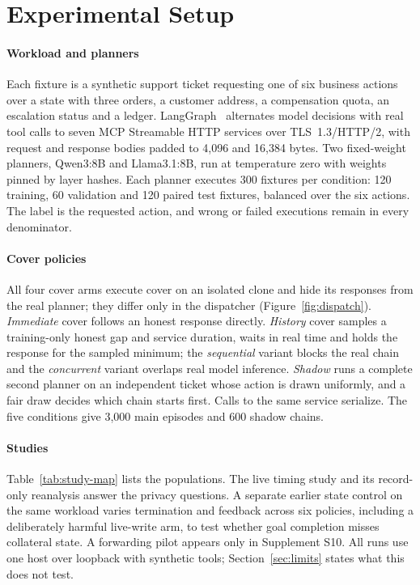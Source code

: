 \section{Experimental Setup}\label{sec:setup}
\paragraph{Workload and planners}
Each fixture is a synthetic support ticket requesting one of six business actions over a state with three orders, a customer address, a compensation quota, an escalation status and a ledger. LangGraph~\cite{langchain2025langgraph} alternates model decisions with real tool calls to seven MCP Streamable HTTP services over TLS~1.3/HTTP/2, with request and response bodies padded to 4,096 and 16,384 bytes. Two fixed-weight planners, Qwen3:8B and Llama3.1:8B, run at temperature zero with weights pinned by layer hashes. Each planner executes 300 fixtures per condition: 120 training, 60 validation and 120 paired test fixtures, balanced over the six actions. The label is the requested action, and wrong or failed executions remain in every denominator.

\paragraph{Cover policies}
All four cover arms execute cover on an isolated clone and hide its responses from the real planner; they differ only in the dispatcher (Figure~\ref{fig:dispatch}). \emph{Immediate} cover follows an honest response directly. \emph{History} cover samples a training-only honest gap and service duration, waits in real time and holds the response for the sampled minimum; the \emph{sequential} variant blocks the real chain and the \emph{concurrent} variant overlaps real model inference. \emph{Shadow} runs a complete second planner on an independent ticket whose action is drawn uniformly, and a fair draw decides which chain starts first. Calls to the same service serialize. The five conditions give 3,000 main episodes and 600 shadow chains.




\paragraph{Studies}
Table~\ref{tab:study-map} lists the populations. The live timing study and its record-only reanalysis answer the privacy questions. A separate earlier state control on the same workload varies termination and feedback across six policies, including a deliberately harmful live-write arm, to test whether goal completion misses collateral state. A forwarding pilot appears only in Supplement S10. All runs use one host over loopback with synthetic tools; Section~\ref{sec:limits} states what this does not test.
